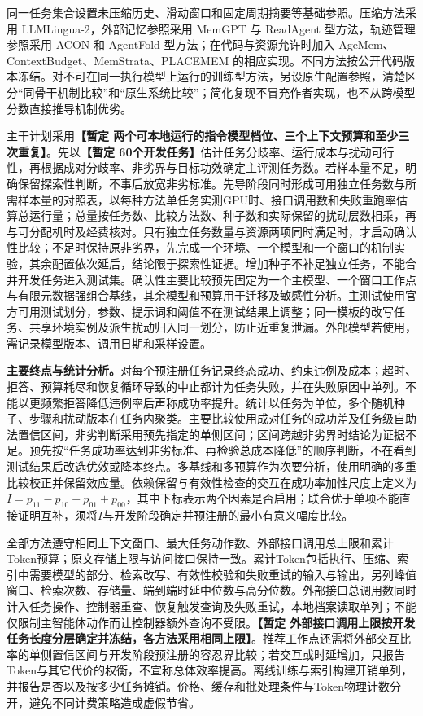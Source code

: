 同一任务集合设置未压缩历史、滑动窗口和固定周期摘要等基础参照。压缩方法采用 LLMLingua-2，外部记忆参照采用 MemGPT 与 ReadAgent 型方法，轨迹管理参照采用 ACON 和 AgentFold 型方法；在代码与资源允许时加入 AgeMem、ContextBudget、MemStrata、PLACEMEM 的相应实现。不同方法按公开代码版本冻结。对不可在同一执行模型上运行的训练型方法，另设原生配置参照，清楚区分“同骨干机制比较”和“原生系统比较”；简化复现不冒充作者实现，也不从跨模型分数直接推导机制优劣。

主干计划采用\textbf{【暂定 两个可本地运行的指令模型档位、三个上下文预算和至少三次重复】}。先以\textbf{【暂定 60个开发任务】}估计任务分歧率、运行成本与扰动可行性，再根据成对分歧率、非劣界与目标功效确定主评测任务数。若样本量不足，明确保留探索性判断，不事后放宽非劣标准。先导阶段同时形成可用独立任务数与所需样本量的对照表，以每种方法单任务实测GPU时、接口调用数和失败重跑率估算总运行量；总量按任务数、比较方法数、种子数和实际保留的扰动层数相乘，再与可分配机时及经费核对。只有独立任务数量与资源两项同时满足时，才启动确认性比较；不足时保持原非劣界，先完成一个环境、一个模型和一个窗口的机制实验，其余配置依次延后，结论限于探索性证据。增加种子不补足独立任务，不能合并开发任务进入测试集。确认性主要比较预先固定为一个主模型、一个窗口工作点与有限元数据强组合基线，其余模型和预算用于迁移及敏感性分析。主测试使用官方可用测试划分，参数、提示词和阈值不在测试结果上调整；同一模板的改写任务、共享环境实例及派生扰动归入同一划分，防止近重复泄漏。外部模型若使用，需记录模型版本、调用日期和采样设置。

\textbf{主要终点与统计分析。}对每个预注册任务记录终态成功、约束违例及成本；超时、拒答、预算耗尽和恢复循环导致的中止都计为任务失败，并在失败原因中单列。不能以更频繁拒答降低违例率后声称成功率提升。统计以任务为单位，多个随机种子、步骤和扰动版本在任务内聚类。主要比较使用成对任务的成功差及任务级自助法置信区间，非劣判断采用预先指定的单侧区间；区间跨越非劣界时结论为证据不足。预先按“任务成功率达到非劣标准、再检验总成本降低”的顺序判断，不在看到测试结果后改选优效或降本终点。多基线和多预算作为次要分析，使用明确的多重比较校正并保留效应量。依赖保留与有效性检查的交互在成功率加性尺度上定义为\(I=p_{11}-p_{10}-p_{01}+p_{00}\)，其中下标表示两个因素是否启用；联合优于单项不能直接证明互补，须将\(I\)与开发阶段确定并预注册的最小有意义幅度比较。

全部方法遵守相同上下文窗口、最大任务动作数、外部接口调用总上限和累计Token预算；原文存储上限与访问接口保持一致。累计Token包括执行、压缩、索引中需要模型的部分、检索改写、有效性校验和失败重试的输入与输出，另列峰值窗口、检索次数、存储量、端到端时延中位数与高分位数。外部接口总调用数同时计入任务操作、控制器重查、恢复触发查询及失败重试，本地档案读取单列；不能仅限制主智能体动作而让控制器额外查询不受限。\textbf{【暂定 外部接口调用上限按开发任务长度分层确定并冻结，各方法采用相同上限】}。推荐工作点还需将外部交互比率的单侧置信区间与开发阶段预注册的容忍界比较；若交互或时延增加，只报告Token与其它代价的权衡，不宣称总体效率提高。离线训练与索引构建开销单列，并报告是否以及按多少任务摊销。价格、缓存和批处理条件与Token物理计数分开，避免不同计费策略造成虚假节省。

